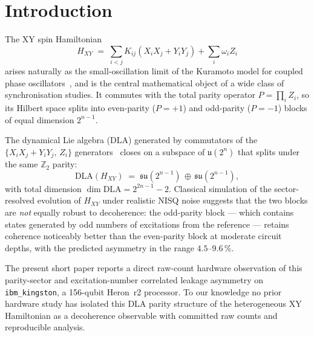 \documentclass[reprint,aps,physrev,superscriptaddress,floatfix,longbibliography]{revtex4-2}
\begin{document}
\maketitle

\section{Introduction}

The XY spin Hamiltonian
%
\begin{equation}\label{eq:hxy}
  H_{XY} \;=\; \sum_{i<j} K_{ij}\!\left( X_i X_j + Y_i Y_j \right)
             + \sum_i \omega_i Z_i
\end{equation}
%
arises naturally as the small-oscillation limit of the Kuramoto model
for coupled phase oscillators~\cite{Kuramoto1984,Pikovsky2001}, and is
the central mathematical object of a wide class of synchronisation
studies. It commutes with the total parity operator
$P = \prod_i Z_i$, so its Hilbert space splits into even-parity
($P = +1$) and odd-parity ($P = -1$) blocks of equal dimension
$2^{n-1}$.

The dynamical Lie algebra (DLA) generated by commutators of the
$\{X_i X_j + Y_i Y_j,\, Z_i\}$ generators~\cite{Wiersema2023} closes
on a subspace of $\mathfrak{u}(2^n)$ that splits under the same
$\mathbb{Z}_2$ parity:
%
\begin{equation}\label{eq:dla}
  \mathrm{DLA}(H_{XY}) \;=\;
    \mathfrak{su}\!\left(2^{n-1}\right)
    \,\oplus\,
    \mathfrak{su}\!\left(2^{n-1}\right),
\end{equation}
%
with total dimension $\dim \mathrm{DLA} = 2^{2n-1} - 2$.
Classical simulation of the sector-resolved evolution of $H_{XY}$
under realistic NISQ noise suggests that the two blocks are
\emph{not} equally robust to decoherence: the odd-parity block ---
which contains states generated by odd numbers of excitations from
the reference --- retains coherence noticeably better than the
even-parity block at moderate circuit depths, with the predicted
asymmetry in the range $4.5$--$9.6\,\%$.

The present short paper reports a direct raw-count hardware
observation of this parity-sector and excitation-number correlated
leakage asymmetry on \texttt{ibm\_kingston}, a 156-qubit Heron~r2
processor. To our knowledge no prior hardware study has isolated this
DLA parity structure of the heterogeneous XY Hamiltonian as a
decoherence observable with committed raw counts and reproducible
analysis.
\end{document}
